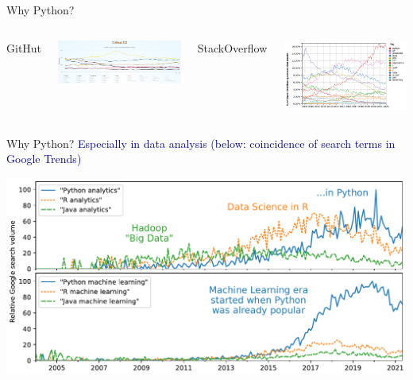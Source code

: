 \documentclass[aspectratio=169]{beamer}
\begin{document}
\begin{frame}{Why Python?}
\vspace{0.25 cm}
\begin{columns}[t]
\centering GitHut

\vspace{0.1 cm}
\includegraphics[width=\linewidth]{python-rankings-githut-2022.png}

\centering StackOverflow

\vspace{0.1 cm}
\includegraphics[width=\linewidth]{python-rankings-stackoverflow-2022.png}
\end{columns}
\end{frame}

\begin{frame}{Why Python?}
\large
\vspace{0.25 cm}
\textcolor{darkblue}{\mbox{\hspace{-0.5 cm}}Especially in data analysis (below: coincidence of search terms in Google Trends)}

\vspace{0.15 cm}
\includegraphics[width=\linewidth]{analytics-by-language.pdf}
\end{frame}
\end{document}
